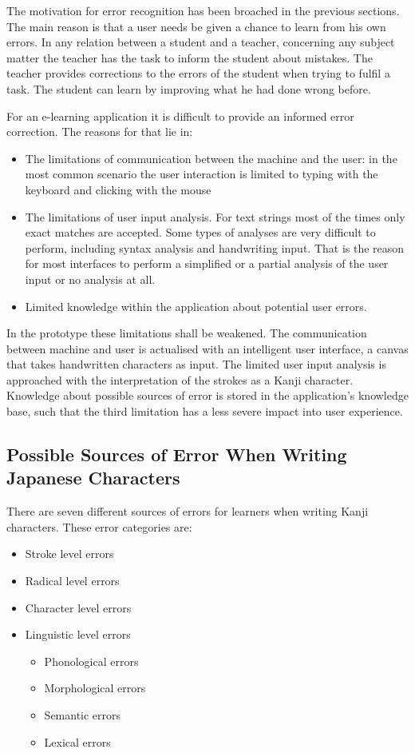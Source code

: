 The motivation for error recognition has been broached in the previous sections.
The main reason is that a user needs be given a chance to learn from his own 
errors. In any relation between a student and a teacher, concerning any subject 
matter the teacher has the task to inform the student about mistakes.
The teacher provides corrections to the errors of the student when trying
to fulfil a task. The student can learn by improving what he had done wrong 
before. 

For an e-learning application it is difficult to provide an informed error 
correction. The reasons for that lie in:
\begin{itemize}
  \item The limitations of communication between the machine and the user:
        in the most common scenario the user interaction is limited to
        typing with the keyboard and clicking with the mouse
  \item The limitations of user input analysis. For text strings most of the
        times only exact matches are accepted. Some types of analyses are very
        difficult to perform, including syntax analysis and handwriting input.
        That is the reason for most interfaces to perform a simplified
        or a partial analysis of the user input or no analysis at all.
  \item Limited knowledge within the application about potential user errors.
\end{itemize}
In the prototype these limitations shall be weakened. The communication between
machine and user is actualised with an intelligent user interface, a canvas that
takes handwritten characters as input. The limited user input analysis is
approached with the interpretation of the strokes as a Kanji character.
Knowledge about possible sources of error is stored in the application's 
knowledge base, such that the third limitation has a less severe impact into
user experience.

\subsection[Sources of Error]{Possible Sources of Error When Writing Japanese Characters}
\label{sec:concept:sourcesoferror}

There are seven different sources of errors for learners when writing Kanji 
characters. These error categories are:
\begin{itemize}
\item Stroke level errors
\item Radical level errors
\item Character level errors
\item Linguistic level errors
  \begin{itemize}
  \item Phonological errors
  \item Morphological errors
  \item Semantic errors
  \item Lexical errors
  \end{itemize}
\end{itemize}

